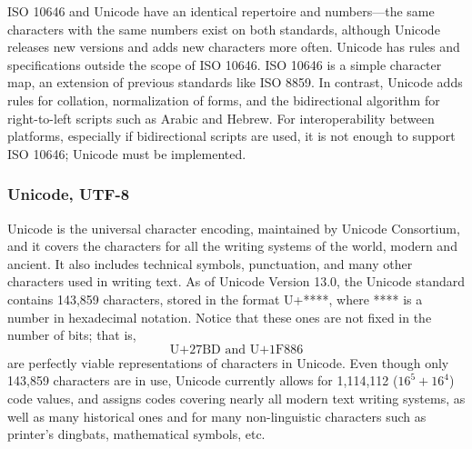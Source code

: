     ISO 10646 and Unicode have an identical repertoire and numbers—the same characters with the same numbers exist on both standards, although Unicode releases new versions and adds new characters more often. Unicode has rules and specifications outside the scope of ISO 10646. ISO 10646 is a simple character map, an extension of previous standards like ISO 8859. In contrast, Unicode adds rules for collation, normalization of forms, and the bidirectional algorithm for right-to-left scripts such as Arabic and Hebrew. For interoperability between platforms, especially if bidirectional scripts are used, it is not enough to support ISO 10646; Unicode must be implemented.

  \subsubsection{Unicode, UTF-8}

    Unicode is the universal character encoding, maintained by Unicode Consortium, and it covers the characters for all the writing systems of the world, modern and ancient. It also includes technical symbols, punctuation, and many other characters used in writing text. As of Unicode Version 13.0, the Unicode standard contains 143,859 characters, stored in the format U+****, where **** is a number in hexadecimal notation. Notice that these ones are not fixed in the number of bits; that is, 
    \[\text{U+27BD and U+1F886}\]
    are perfectly viable representations of characters in Unicode. Even though only 143,859 characters are in use, Unicode currently allows for 1,114,112 ($16^5 + 16^4$) code values, and assigns codes covering nearly all modern text writing systems, as well as many historical ones and for many non-linguistic characters such as printer's dingbats, mathematical symbols, etc.

